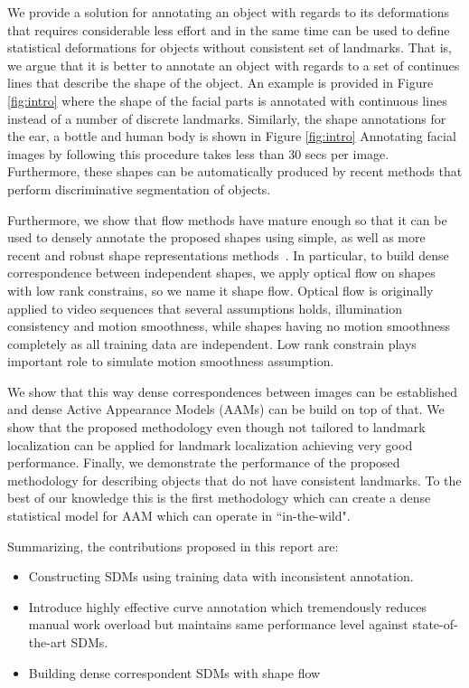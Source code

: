 We provide a solution for annotating an object with regards to its deformations that requires considerable less effort and in the same time can be used to define statistical deformations for objects without consistent set of landmarks. That is, we argue that it is better to annotate an object with regards to a set of continues lines that describe the shape of the object. An example is provided in Figure \ref{fig:intro} where the shape of the facial parts is annotated with continuous lines instead of a number of discrete landmarks. Similarly, the shape annotations for the ear, a bottle and human body is shown in Figure \ref{fig:intro} Annotating facial images by following this procedure takes less than 30 secs per image. Furthermore, these shapes can be automatically produced by recent methods that perform discriminative segmentation of objects. 

Furthermore, we show that flow methods have mature enough so that it can be used to densely annotate the proposed shapes using simple, as well as more recent and robust shape representations methods~\cite{Garg2013,Nguyen2013}.  In particular, to build dense correspondence between independent shapes, we apply optical flow on shapes with low rank constrains, so we name it shape flow. Optical flow is originally applied to video sequences that several assumptions holds, illumination consistency and motion smoothness, while shapes having no motion smoothness completely as all training data are independent. Low rank constrain plays important role to simulate motion smoothness assumption. 

We show that this way dense correspondences between images can be established and dense Active Appearance Models (AAMs) can be build on top of that. We show that the proposed methodology even though not tailored to landmark localization can be applied for landmark localization achieving very good performance. Finally, we demonstrate the performance of the proposed methodology for describing objects that do not have consistent landmarks. To the best of our knowledge this is the first methodology which can create a dense statistical model for AAM which can operate in ``in-the-wild".

Summarizing, the contributions proposed in this report are:
\begin{itemize}
  \item Constructing SDMs using training data with inconsistent annotation.
  \item Introduce highly effective curve annotation which tremendously reduces manual work overload but maintains same performance level against state-of-the-art SDMs.
  \item Building dense correspondent SDMs with shape flow
\end{itemize}


